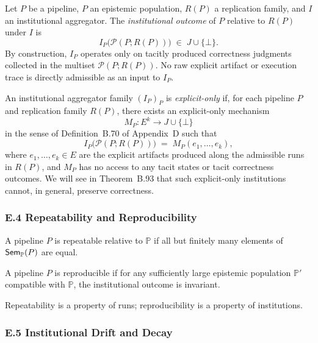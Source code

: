 \begin{definition}\label{def:B88}
Let $P$ be a pipeline, $P$ an epistemic population, $R(P)$ a replication family, and $I$ an institutional aggregator. The \emph{institutional outcome} of $P$ relative to $R(P)$ under $I$ is
\[
  I_P\bigl(\mathcal{P}(P; R(P))\bigr) \;\in\; J \cup \{\bot\}.
\]
By construction, $I_P$ operates only on tacitly produced correctness judgments collected in the multiset $\mathcal{P}(P; R(P))$. No raw explicit artifact or execution trace is directly admissible as an input to $I_P$.
\end{definition}

\begin{definition}\label{def:B88prime}
An institutional aggregator family $(I_P)_P$ is \emph{explicit-only} if, for each pipeline $P$ and replication family $R(P)$, there exists an explicit-only mechanism
\[
  M_P : E^k \to J \cup \{\bot\}
\]
in the sense of Definition~B.70 of Appendix~D such that
\[
  I_P\bigl(\mathcal{P}(P; R(P))\bigr)
  \;=\;
  M_P(e_1, \dots, e_k),
\]
where $e_1, \dots, e_k \in E$ are the explicit artifacts produced along the admissible runs in $R(P)$, and $M_P$ has no access to any tacit states or tacit correctness outcomes. We will see in Theorem~B.93 that such explicit-only institutions cannot, in general, preserve correctness.
\end{definition}


\subsubsection*{E.4 Repeatability and Reproducibility}

\begin{definition}[Repeatability]
A pipeline $P$ is repeatable relative to $\mathbb{P}$ if all but finitely many
elements of $\mathsf{Sem}_{\mathbb{P}}(P)$ are equal.
\end{definition}

\begin{definition}[Reproducibility]
A pipeline $P$ is reproducible if for any sufficiently large epistemic
population $\mathbb{P}'$ compatible with $\mathbb{P}$, the institutional
outcome is invariant.
\end{definition}

Repeatability is a property of runs; reproducibility is a property of
institutions.

\subsubsection*{E.5 Institutional Drift and Decay}

